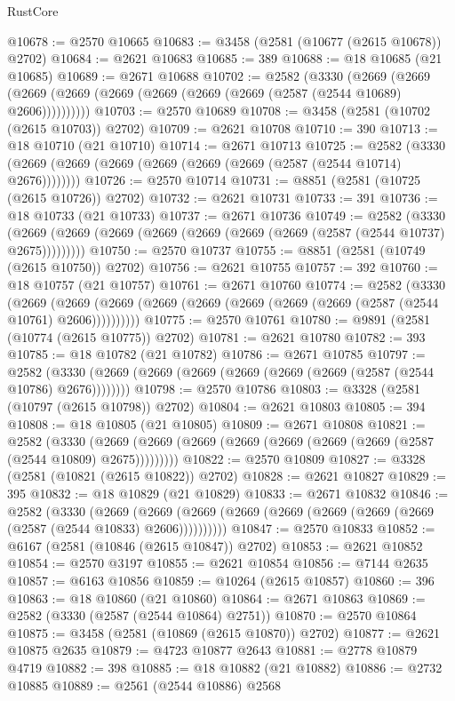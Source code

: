 \begin{lexlean}{RustCore}
\begin{coremodule}
@10678 := @2570 @10665
@10683 := @3458 (@2581 (@10677 (@2615 @10678)) @2702)
@10684 := @2621 @10683
@10685 := 389
@10688 := @18 @10685 (@21 @10685)
@10689 := @2671 @10688
@10702 := @2582
    (@3330
      (@2669 (@2669 (@2669 (@2669 (@2669 (@2669 (@2669 (@2669 (@2587 (@2544 @10689) @2606))))))))))
@10703 := @2570 @10689
@10708 := @3458 (@2581 (@10702 (@2615 @10703)) @2702)
@10709 := @2621 @10708
@10710 := 390
@10713 := @18 @10710 (@21 @10710)
@10714 := @2671 @10713
@10725 := @2582 (@3330 (@2669 (@2669 (@2669 (@2669 (@2669 (@2669 (@2587 (@2544 @10714) @2676))))))))
@10726 := @2570 @10714
@10731 := @8851 (@2581 (@10725 (@2615 @10726)) @2702)
@10732 := @2621 @10731
@10733 := 391
@10736 := @18 @10733 (@21 @10733)
@10737 := @2671 @10736
@10749 := @2582
    (@3330 (@2669 (@2669 (@2669 (@2669 (@2669 (@2669 (@2669 (@2587 (@2544 @10737) @2675)))))))))
@10750 := @2570 @10737
@10755 := @8851 (@2581 (@10749 (@2615 @10750)) @2702)
@10756 := @2621 @10755
@10757 := 392
@10760 := @18 @10757 (@21 @10757)
@10761 := @2671 @10760
@10774 := @2582
    (@3330
      (@2669 (@2669 (@2669 (@2669 (@2669 (@2669 (@2669 (@2669 (@2587 (@2544 @10761) @2606))))))))))
@10775 := @2570 @10761
@10780 := @9891 (@2581 (@10774 (@2615 @10775)) @2702)
@10781 := @2621 @10780
@10782 := 393
@10785 := @18 @10782 (@21 @10782)
@10786 := @2671 @10785
@10797 := @2582 (@3330 (@2669 (@2669 (@2669 (@2669 (@2669 (@2669 (@2587 (@2544 @10786) @2676))))))))
@10798 := @2570 @10786
@10803 := @3328 (@2581 (@10797 (@2615 @10798)) @2702)
@10804 := @2621 @10803
@10805 := 394
@10808 := @18 @10805 (@21 @10805)
@10809 := @2671 @10808
@10821 := @2582
    (@3330 (@2669 (@2669 (@2669 (@2669 (@2669 (@2669 (@2669 (@2587 (@2544 @10809) @2675)))))))))
@10822 := @2570 @10809
@10827 := @3328 (@2581 (@10821 (@2615 @10822)) @2702)
@10828 := @2621 @10827
@10829 := 395
@10832 := @18 @10829 (@21 @10829)
@10833 := @2671 @10832
@10846 := @2582
    (@3330
      (@2669 (@2669 (@2669 (@2669 (@2669 (@2669 (@2669 (@2669 (@2587 (@2544 @10833) @2606))))))))))
@10847 := @2570 @10833
@10852 := @6167 (@2581 (@10846 (@2615 @10847)) @2702)
@10853 := @2621 @10852
@10854 := @2570 @3197
@10855 := @2621 @10854
@10856 := @7144 @2635
@10857 := @6163 @10856
@10859 := @10264 (@2615 @10857)
@10860 := 396
@10863 := @18 @10860 (@21 @10860)
@10864 := @2671 @10863
@10869 := @2582 (@3330 (@2587 (@2544 @10864) @2751))
@10870 := @2570 @10864
@10875 := @3458 (@2581 (@10869 (@2615 @10870)) @2702)
@10877 := @2621 @10875 @2635
@10879 := @4723 @10877 @2643
@10881 := @2778 @10879 @4719
@10882 := 398
@10885 := @18 @10882 (@21 @10882)
@10886 := @2732 @10885
@10889 := @2561 (@2544 @10886) @2568

\end{coremodule}
\end{lexlean}
